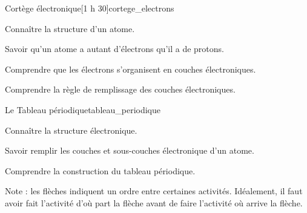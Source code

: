 \begin{multicols}{2}    
  \begin{activite}{Cortège électronique}[1 h 30]{cortege_electrons}
    \begin{prerequis}
      \item Connaître la structure d'un atome.
      \item Savoir qu'un atome a autant d'électrons qu'il a de protons.
    \end{prerequis}
    \begin{objectifs}
      \item Comprendre que les électrons s'organisent en couches électroniques.
      \item Comprendre la règle de remplissage des couches électroniques.
    \end{objectifs}
  \end{activite}

  \begin{TP}{Le Tableau périodique}{tableau_periodique}
    \begin{prerequis}
      \item Connaître la structure électronique.
      \item Savoir remplir les couches et sous-couches électronique d'un atome.
    \end{prerequis}
    \begin{objectifs}
      \item Comprendre la construction du tableau périodique.
    \end{objectifs}
  \end{TP}
\end{multicols}

\vspace*{-2cm}

\vspace*{1.5cm}
Note : les flèches indiquent un ordre entre certaines activités.
Idéalement, il faut avoir fait l'activité d'où part la flèche avant de faire l'activité où arrive la flèche.


\newpage
\nomPrenomClasse
{}
\vspace*{24pt}

